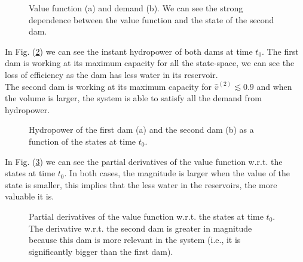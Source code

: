 \begin{figure}[H]
\centering
{}\qquad
{}
\caption{Value function (a) and demand (b). We can see the strong dependence between the value function and the state of the second dam.}
\label{Plot_SP2_1}
\end{figure}

In Fig. (\ref{Plot_SP2_2}) we can see the instant hydropower of both dams at time $t_0$. The first dam is working at its maximum capacity for all the state-space, we can see the loss of efficiency as the dam has less water in its reservoir.\\
The second dam is working at its maximum capacity for $\hat{v}^{(2)}\lesssim0.9$ and when the volume is larger, the system is able to satisfy all the demand from hydropower.

\begin{figure}[H]
\centering
{}\qquad
{}
\caption{Hydropower of the first dam (a) and the second dam (b) as a function of the states at time $t_0$.}
\label{Plot_SP2_2}
\end{figure}

In Fig. (\ref{Plot_SP2_3}) we can see the partial derivatives of the value function w.r.t. the states at time $t_0$. In both cases, the magnitude is larger when the value of the state is smaller, this implies that the less water in the reservoirs, the more valuable it is.

\begin{figure}[H]
\centering
{}\qquad
{}
\caption{Partial derivatives of the value function w.r.t. the states at time $t_0$. The derivative w.r.t. the second dam is greater in magnitude because this dam is more relevant in the system (i.e., it is significantly bigger than the first dam).}
\label{Plot_SP2_3}
\end{figure}

